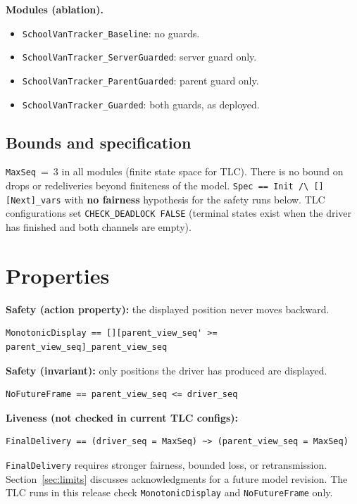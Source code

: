 \documentclass[11pt,a4paper]{article}
\begin{document}
\textbf{Modules (ablation).}
\begin{itemize}[noitemsep]
  \item \texttt{SchoolVanTracker\_Baseline}: no guards.
  \item \texttt{SchoolVanTracker\_ServerGuarded}: server guard only.
  \item \texttt{SchoolVanTracker\_ParentGuarded}: parent guard only.
  \item \texttt{SchoolVanTracker\_Guarded}: both guards, as deployed.
\end{itemize}

\subsection{Bounds and specification}

\texttt{MaxSeq}~=~3 in all modules (finite state space for TLC). There is no bound on drops or redeliveries beyond finiteness of the model. \verb|Spec == Init /\ [][Next]_vars| with \textbf{no fairness} hypothesis for the safety runs below. TLC configurations set \texttt{CHECK\_DEADLOCK FALSE} (terminal states exist when the driver has finished and both channels are empty).

\section{Properties}
\label{sec:properties}

\textbf{Safety (action property):} the displayed position never moves backward.
\begin{lstlisting}
MonotonicDisplay == [][parent_view_seq' >= parent_view_seq]_parent_view_seq
\end{lstlisting}

\textbf{Safety (invariant):} only positions the driver has produced are displayed.
\begin{lstlisting}
NoFutureFrame == parent_view_seq <= driver_seq
\end{lstlisting}

\textbf{Liveness (not checked in current TLC configs):}
\begin{lstlisting}
FinalDelivery == (driver_seq = MaxSeq) ~> (parent_view_seq = MaxSeq)
\end{lstlisting}

\texttt{FinalDelivery} requires stronger fairness, bounded loss, or retransmission. Section~\ref{sec:limits} discusses acknowledgments for a future model revision. The TLC runs in this release check \texttt{MonotonicDisplay} and \texttt{NoFutureFrame} only.
\end{document}

